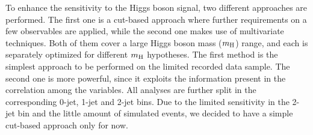 To enhance the sensitivity to the Higgs boson signal, two different approaches 
are performed. The first one is a cut-based approach where further requirements 
on a few observables are applied, while the second one makes use of
multivariate techniques. Both of them cover a large Higgs boson mass
($m_{\rm{H}}$) range, and each is separately optimized for different
$m_{\rm{H}}$ hypotheses. The first method is the simplest approach to
be performed on the limited recorded data sample. The second one is
more powerful, since it exploits the information present in the
correlation among the variables. All analyses are further split in 
the corresponding 0-jet, 1-jet and 2-jet bins. Due to the limited 
sensitivity in the 2-jet bin and the little amount of simulated events, 
we decided to have a simple cut-based approach only for now.
